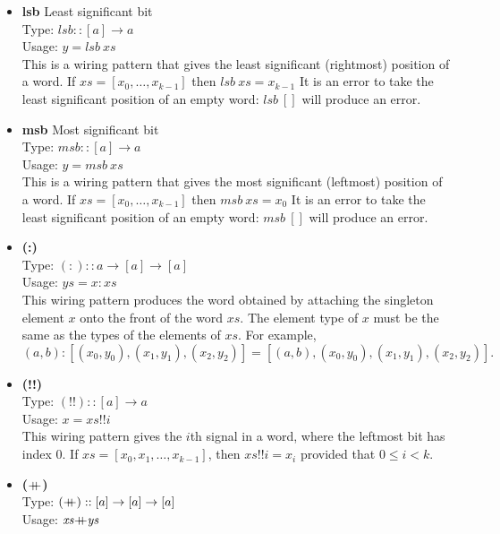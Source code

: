 \documentclass[a4paper,openany,fleqn]{book}
\def\plusplus{\hbox{$+\hskip-0.5em+$}}
\def\plusplus{\hbox{$+\hskip-0.5em+$}}
\begin{document}
\begin{itemize}
\item \textbf{lsb} Least significant bit \\
  Type: $\mathit{lsb} :: [a] \rightarrow a$ \\
  Usage: $y = \mathit{lsb}\ \mathit{xs}$ \\
  This is a wiring pattern that gives the least significant
  (rightmost) position of a word.  If $\mathit{xs} = [x_0, \ldots,
  x_{k-1}]$ then $\mathit{lsb}\ \mathit{xs} = x_{k-1}$ It is an error
  to take the least significant position of an empty word:
  $\mathit{lsb}\ []$ will produce an error.
\item \textbf{msb} Most significant bit\\
  Type: $\mathit{msb} :: [a] \rightarrow a$ \\
  Usage: $y = \mathit{msb}\ \mathit{xs}$ \\
  This is a wiring pattern that gives the most significant (leftmost)
  position of a word.  If $\mathit{xs} = [x_0, \ldots, x_{k-1}]$ then
  $\mathit{msb}\ \mathit{xs} = x_0$ It is an error to take the least
  significant position of an empty word: $\mathit{msb}\ []$ will
  produce an error.
\item \textbf{(:)} \\
  Type: $(:) :: a \rightarrow [a] \rightarrow [a]$ \\
  Usage: $\mathit{ys} = x : \mathit{xs}$ \\
  This wiring pattern produces the word obtained by attaching the
  singleton element $x$ onto the front of the word $\mathit{xs}$.  The
  element type of $x$ must be the same as the types of the elements of
  $\mathit{xs}$.  For example, \[(a,b) : [(x_0,y_0), (x_1,y_1),
  (x_2,y_2)] = [(a,b), (x_0,y_0), (x_1,y_1), (x_2,y_2)].\]
\item \textbf{(!!)} \\
  Type: $(!!) :: [a] \rightarrow a$ \\
  Usage: $x = \mathit{xs}!!i$ \\
  This wiring pattern gives the $i$th signal in a word, where the
  leftmost bit has index 0.  If $\mathit{xs} = [x_0, x_1, \ldots,
  x_{k-1}]$, then $\mathit{xs}!!i = x_i$ provided that $0 \leq i < k$.
\item \textbf{(\plusplus)} \\
  Type: $(\plusplus) :: [a] \rightarrow [a] \rightarrow [a]$ \\
  Usage: $\mathit{xs} \plusplus \mathit{ys}$ \\

\end{itemize}
\end{document}
